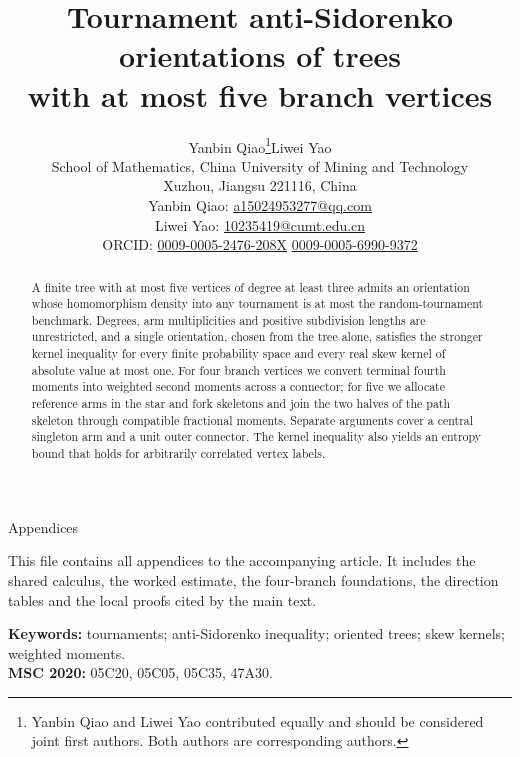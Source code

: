 \documentclass[11pt]{article}
\title{Tournament anti-Sidorenko orientations of trees\\with at most five branch vertices}
\author{%
\begin{tabular}{c}
Yanbin Qiao\thanks{Yanbin Qiao and Liwei Yao contributed equally and should be considered joint first authors. Both authors are corresponding authors.}\quad Liwei Yao\\[0.4em]
\normalsize School of Mathematics, China University of Mining and Technology\\
\normalsize Xuzhou, Jiangsu 221116, China\\[0.3em]
\small Yanbin Qiao: \href{mailto:a15024953277@qq.com}{a15024953277@qq.com}\\
\small Liwei Yao: \href{mailto:10235419@cumt.edu.cn}{10235419@cumt.edu.cn}\\
\small ORCID: \href{https://orcid.org/0009-0005-2476-208X}{0009-0005-2476-208X}\quad
\href{https://orcid.org/0009-0005-6990-9372}{0009-0005-6990-9372}
\end{tabular}}
\date{}
\numberwithin{equation}{section}
\theoremstyle{definition}
\theoremstyle{remark}
\begin{document}
\raggedbottom
\maketitle
\ifdefined\SupplementView
\setcounter{table}{9}
\setcounter{figure}{6}
\begin{center}\large Appendices\end{center}
This file contains all appendices to the accompanying article. It includes
the shared calculus, the worked estimate, the four-branch foundations,
the direction tables and the local proofs cited by the main text.
\setcounter{tocdepth}{2}
\tableofcontents
\clearpage
\else
\begin{abstract}
A finite tree with at most five vertices of degree at least three admits an orientation whose homomorphism density into any tournament is at most the random-tournament benchmark. Degrees, arm multiplicities and positive subdivision lengths are unrestricted, and a single orientation, chosen from the tree alone, satisfies the stronger kernel inequality for every finite probability space and every real skew kernel of absolute value at most one. For four branch vertices we convert terminal fourth moments into weighted second moments across a connector; for five we allocate reference arms in the star and fork skeletons and join the two halves of the path skeleton through compatible fractional moments. Separate arguments cover a central singleton arm and a unit outer connector. The kernel inequality also yields an entropy bound that holds for arbitrarily correlated vertex labels.
\end{abstract}
\noindent\textbf{Keywords:} tournaments; anti-Sidorenko inequality; oriented trees; skew kernels; weighted moments.\\
\textbf{MSC 2020:} 05C20, 05C05, 05C35, 47A30.\\
\ifdefined\ArticleView\else
\setcounter{tocdepth}{2}\tableofcontents\clearpage
\fi














\clearpage
\nocite{*}
\ifdefined\ArticleView
\else
\fi


\fi
\ifdefined\ArticleView
\else
\clearpage
\appendix



 
 
 
 
 
 
 
 
 
 
\fi
\end{document}
